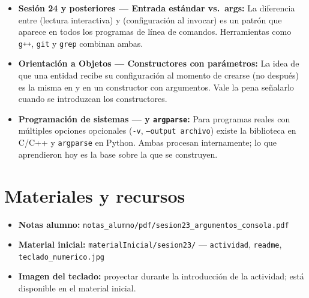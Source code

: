 \documentclass[12pt, oneside]{article}
\begin{document}
\begin{itemize}
  \item \textbf{Sesión 24 y posteriores --- Entrada estándar vs.\ args:}
        La diferencia entre  (lectura interactiva) y 
        (configuración al invocar) es un patrón que aparece en todos
        los programas de línea de comandos.  Herramientas como
        \texttt{g++}, \texttt{git} y \texttt{grep} combinan ambas.
  \item \textbf{Orientación a Objetos --- Constructores con parámetros:}
        La idea de que una entidad recibe su configuración al momento de
        crearse (no después) es la misma en  y en
        un constructor con argumentos.  Vale la pena señalarlo cuando
        se introduzcan los constructores.
  \item \textbf{Programación de sistemas ---  y
        \texttt{argparse}:}
        Para programas reales con múltiples opciones opcionales
        (\texttt{-v}, \texttt{--output archivo}) existe la biblioteca
         en C/C++ y \texttt{argparse} en Python.  Ambas
        procesan  internamente; lo que aprendieron hoy es
        la base sobre la que se construyen.
\end{itemize}

\section{Materiales y recursos}

\begin{itemize}
  \item \textbf{Notas alumno:}
        \texttt{notas\_alumno/pdf/sesion23\_argumentos\_consola.pdf}
  \item \textbf{Material inicial:}
        \texttt{materialInicial/sesion23/} --- \texttt{actividad},
        \texttt{readme}, \texttt{teclado\_numerico.jpg}
  \item \textbf{Imagen del teclado:} proyectar durante la introducción
        de la actividad; está disponible en el material inicial.
\end{itemize}
\end{document}
